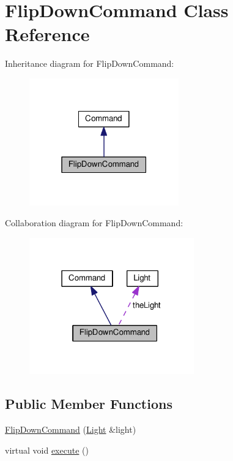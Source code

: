 \hypertarget{classFlipDownCommand}{}\section{Flip\+Down\+Command Class Reference}
\label{classFlipDownCommand}


Inheritance diagram for Flip\+Down\+Command\+:
\nopagebreak
\begin{figure}[H]
\begin{center}
\leavevmode
\includegraphics[width=183pt]{classFlipDownCommand__inherit__graph}
\end{center}
\end{figure}


Collaboration diagram for Flip\+Down\+Command\+:
\nopagebreak
\begin{figure}[H]
\begin{center}
\leavevmode
\includegraphics[width=202pt]{classFlipDownCommand__coll__graph}
\end{center}
\end{figure}
\subsection*{Public Member Functions}
\begin{DoxyCompactItemize}
\item 
\hyperlink{classFlipDownCommand_af218198d340956c93e27033f48258bf8}{Flip\+Down\+Command} (\hyperlink{classLight}{Light} \&light)
\item 
virtual void \hyperlink{classFlipDownCommand_a5514f3bdf8d7601f3252361635f9c3a1}{execute} ()
\end{DoxyCompactItemize}
